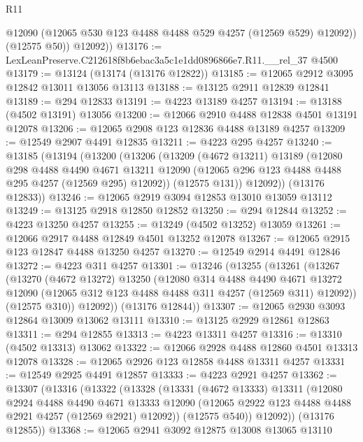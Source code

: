 \begin{lexlean}{R11}
\begin{coremodule}
            @12090
            (@12065 @530 @123 @4488 @4488 @529 @4257 (@12569 @529) @12092))
          (@12575 @50))
        @12092))
@13176 := LexLeanPreserve.C212618f8b6ebac3a5c1e1dd0896866e7.R11.__rel_37 @4500
@13179 := @13124 (@13174 (@13176 @12822))
@13185 := @12065 @2912 @3095 @12842 @13011 @13056 @13113
@13188 := @13125 @2911 @12839 @12841
@13189 := @294 @12833
@13191 := @4223 @13189 @4257
@13194 := @13188 (@4502 @13191) @13056
@13200 := @12066 @2910 @4488 @12838 @4501 @13191 @12078
@13206 := @12065 @2908 @123 @12836 @4488 @13189 @4257
@13209 := @12549 @2907 @4491 @12835
@13211 := @4223 @295 @4257
@13240 := @13185
    (@13194
      (@13200
        (@13206
          (@13209
            (@4672 @13211)
            @13189
            (@12080
              @298
              @4488
              @4490
              @4671
              @13211
              @12090
              (@12065 @296 @123 @4488 @4488 @295 @4257 (@12569 @295) @12092))
            (@12575 @131))
          @12092))
      (@13176 @12833))
@13246 := @12065 @2919 @3094 @12853 @13010 @13059 @13112
@13249 := @13125 @2918 @12850 @12852
@13250 := @294 @12844
@13252 := @4223 @13250 @4257
@13255 := @13249 (@4502 @13252) @13059
@13261 := @12066 @2917 @4488 @12849 @4501 @13252 @12078
@13267 := @12065 @2915 @123 @12847 @4488 @13250 @4257
@13270 := @12549 @2914 @4491 @12846
@13272 := @4223 @311 @4257
@13301 := @13246
    (@13255
      (@13261
        (@13267
          (@13270
            (@4672 @13272)
            @13250
            (@12080
              @314
              @4488
              @4490
              @4671
              @13272
              @12090
              (@12065 @312 @123 @4488 @4488 @311 @4257 (@12569 @311) @12092))
            (@12575 @310))
          @12092))
      (@13176 @12844))
@13307 := @12065 @2930 @3093 @12864 @13009 @13062 @13111
@13310 := @13125 @2929 @12861 @12863
@13311 := @294 @12855
@13313 := @4223 @13311 @4257
@13316 := @13310 (@4502 @13313) @13062
@13322 := @12066 @2928 @4488 @12860 @4501 @13313 @12078
@13328 := @12065 @2926 @123 @12858 @4488 @13311 @4257
@13331 := @12549 @2925 @4491 @12857
@13333 := @4223 @2921 @4257
@13362 := @13307
    (@13316
      (@13322
        (@13328
          (@13331
            (@4672 @13333)
            @13311
            (@12080
              @2924
              @4488
              @4490
              @4671
              @13333
              @12090
              (@12065 @2922 @123 @4488 @4488 @2921 @4257 (@12569 @2921) @12092))
            (@12575 @540))
          @12092))
      (@13176 @12855))
@13368 := @12065 @2941 @3092 @12875 @13008 @13065 @13110

\end{coremodule}
\end{lexlean}
